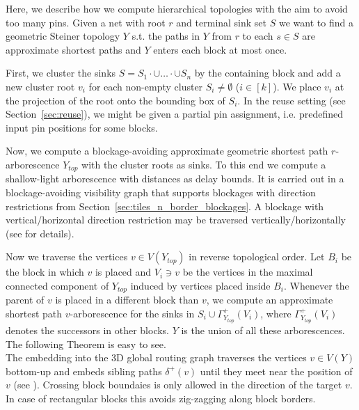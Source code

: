 \documentclass[a2paper]{bigsposter}
\begin{document}
\begin{blockrow}[3]
	Here, we describe how we compute hierarchical topologies with the aim to avoid too many pins.
	Given  a net with root $r$ and terminal sink set $S$ we want to find a geometric Steiner topology $Y$ s.t.
	the paths in $Y$ from $r$ to each $s\in S$  are  approximate shortest paths and $Y$ enters each block at most once.
	
	First, we cluster the sinks $S = S_1\cdot{\cup}\dots\cdot{\cup} S_n$ by the containing block and add a new cluster root $v_i$ for each non-empty cluster $S_i \neq\emptyset$ ($i\in [k]$).
	We place  $v_i$ at  the projection of the root onto the bounding box of $S_i$. 
	In the reuse setting (see Section~\ref{sec:reuse}), we might be given a partial pin assignment, i.e. predefined input pin positions for some blocks. %
	
	
	Now, we compute a  blockage-avoiding approximate geometric shortest path $r$-arborescence $Y_{top}$ with the cluster roots as sinks.
	To this end we compute a shallow-light arborescence \cite{ShallowLight} with distances as delay bounds.
	It is carried out in a  blockage-avoiding visibility graph that supports blockages with direction restrictions from Section~\ref{sec:tiles_n_border_blockages}.
	A blockage with vertical/horizontal direction restriction may be traversed vertically/horizontally (see \cite{bihler-dissertation} for details).
	
	Now we traverse the vertices $v\in V(Y_{top})$ in reverse topological order.
	Let $B_i$ be the block in which $v$ is placed and $V_i\ni v$ be the vertices in the maximal connected component of $Y_{top}$ induced by vertices placed inside $B_i$.
	Whenever the parent of $v$ is placed in a different block than $v$, we compute an approximate shortest path $v$-arborescence for the  sinks in $S_i \cup \Gamma_{Y_{top}}^+(V_i)$,
	where $\Gamma_{Y_{top}}^+(V_i)$ denotes the successors in other blocks.
	$Y$ is the union of all these arborescences. The following Theorem is easy to see.\\
	
	The embedding into the 3D global routing graph traverses the vertices $v\in V(Y)$  bottom-up and embeds sibling paths $\delta^+(v)$
	until they meet near the position of $v$ (see \cite{BRGTiming2}).
	Crossing  block boundaies is only allowed in the direction of the target $v$.
	In case of rectangular blocks this avoids zig-zagging along block borders.\\
\end{blockrow}
\end{document}
